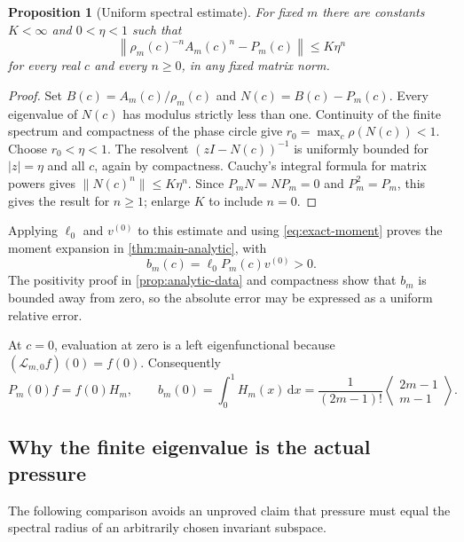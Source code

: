 \documentclass[11pt,a4paper]{article}
\numberwithin{equation}{section}
\newtheorem{proposition}[proposition]{Proposition}
\theoremstyle{definition}
\theoremstyle{remark}
\newcommand{\dd}{\,\mathrm d}
\newcommand{\Lop}{\mathcal L}
\newcommand{\eul}[2]{\left\langle\!\begin{matrix}#1\\#2\end{matrix}\!\right\rangle}
\begin{document}
\begin{proposition}[Uniform spectral estimate]
\label{prop:uniform}
For fixed $m$ there are constants $K<\infty$ and $0<\eta<1$ such that
\[
 \left\|\rho_m(c)^{-n}A_m(c)^n-P_m(c)\right\|
 \leq K\eta^n
\]
for every real $c$ and every $n\geq0$, in any fixed matrix norm.
\end{proposition}
\begin{proof}
Set $B(c)=A_m(c)/\rho_m(c)$ and $N(c)=B(c)-P_m(c)$.
Every eigenvalue of $N(c)$ has modulus strictly less than one.
Continuity of the finite spectrum and compactness of the phase circle
give $r_0=\max_c\rho(N(c))<1$. Choose $r_0<\eta<1$.
The resolvent $(zI-N(c))^{-1}$ is uniformly bounded for $|z|=\eta$
and all $c$, again by compactness. Cauchy's integral formula for matrix
powers gives $\|N(c)^n\|\leq K\eta^n$. Since $P_mN=NP_m=0$
and $P_m^2=P_m$, this gives the result for $n\geq1$; enlarge $K$ to
include $n=0$.
\end{proof}

Applying $\ell_0$ and $v^{(0)}$ to this estimate and using
\cref{eq:exact-moment} proves the moment expansion in
\cref{thm:main-analytic}, with
\begin{equation}
 b_m(c)=\ell_0P_m(c)v^{(0)}>0.
 \label{eq:b}
\end{equation}
The positivity proof in \cref{prop:analytic-data} and compactness show
that $b_m$ is bounded away from zero, so the absolute error may be
expressed as a uniform relative error.

At $c=0$, evaluation at zero is a left eigenfunctional because
$(\Lop_{m,0}f)(0)=f(0)$. Consequently
\begin{equation}
 P_m(0)f=f(0)H_m,\qquad
 b_m(0)=\int_0^1H_m(x)\dd x
 =\frac1{(2m-1)!}\eul{2m-1}{m-1}.
 \label{eq:bzero}
\end{equation}

\subsection{Why the finite eigenvalue is the actual pressure}
The following comparison avoids an unproved claim that pressure must
equal the spectral radius of an arbitrarily chosen invariant subspace.
\end{document}
